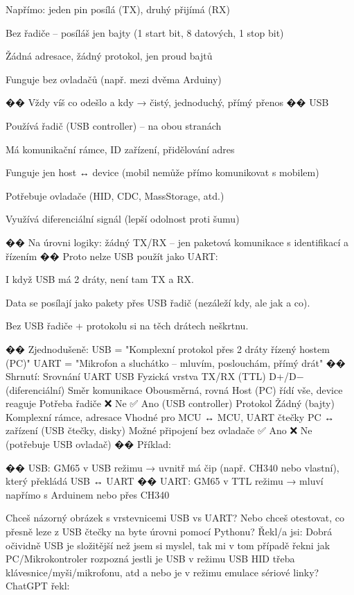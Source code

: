     Napřímo: jeden pin posílá (TX), druhý přijímá (RX)

    Bez řadiče – posíláš jen bajty (1 start bit, 8 datových, 1 stop bit)

    Žádná adresace, žádný protokol, jen proud bajtů

    Funguje bez ovladačů (např. mezi dvěma Arduiny)

�� Vždy víš co odešlo a kdy → čistý, jednoduchý, přímý přenos
�� USB

    Používá řadič (USB controller) – na obou stranách

    Má komunikační rámce, ID zařízení, přidělování adres

    Funguje jen host ↔ device (mobil nemůže přímo komunikovat s mobilem)

    Potřebuje ovladače (HID, CDC, MassStorage, atd.)

    Využívá diferenciální signál (lepší odolnost proti šumu)

�� Na úrovni logiky: žádný TX/RX – jen paketová komunikace s identifikací a řízením
�� Proto nelze USB použít jako UART:

    I když USB má 2 dráty, není tam TX a RX.

    Data se posílají jako pakety přes USB řadič (nezáleží kdy, ale jak a co).

    Bez USB řadiče + protokolu si na těch drátech neškrtnu.

�� Zjednodušeně:
USB =	"Komplexní protokol přes 2 dráty řízený hostem (PC)"
UART =	"Mikrofon a sluchátko – mluvím, poslouchám, přímý drát"
�� Shrnutí:
Srovnání	UART	USB
Fyzická vrstva	TX/RX (TTL)	D+/D− (diferenciální)
Směr komunikace	Obousměrná, rovná	Host (PC) řídí vše, device reaguje
Potřeba řadiče	❌ Ne	✅ Ano (USB controller)
Protokol	Žádný (bajty)	Komplexní rámce, adresace
Vhodné pro	MCU ↔ MCU, UART čtečky	PC ↔ zařízení (USB čtečky, disky)
Možné připojení bez ovladače	✅ Ano	❌ Ne (potřebuje USB ovladač)
�� Příklad:

�� USB: GM65 v USB režimu → uvnitř má čip (např. CH340 nebo vlastní), který překládá USB ↔ UART
�� UART: GM65 v TTL režimu → mluví napřímo s Arduinem nebo přes CH340

Chceš názorný obrázek s vrstevnicemi USB vs UART? Nebo chceš otestovat, co přesně leze z USB čtečky na byte úrovni pomocí Pythonu?
Řekl/a jsi:
Dobrá očividně USB je složitější než jsem si myslel, tak mi v tom případě řekni jak PC/Mikrokontroler rozpozná jestli je USB v režimu USB HID třeba klávesnice/myši/mikrofonu, atd a nebo je v režimu emulace sériové linky?
ChatGPT řekl:

